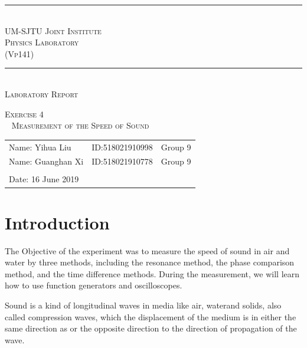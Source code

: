 \documentclass[a4paper]{report}
\begin{document}
	\renewcommand\thesection{\arabic{section}}
	\begin{Large}
		\begin{center}
			\setlength{\baselineskip}{14pt}
			\vspace{1.25cm}
			\rule[0cm]{11.2cm}{0.03em}\\
			\vspace{0.5cm}
			\textsc{UM-SJTU Joint Institute}\\
			\vspace{0.25cm}
			\textsc{Physics Laboratory\\(Vp141)}
			\vspace{0.3cm}
			\rule[0cm]{11.8cm}{0.05em}
			\vspace{4.9cm}\\
			\textsc{Laboratory Report}
		\end{center}
	\end{Large}
	\vspace{0.85cm}
	\begin{large}
		\begin{center}
			\textsc{Exercise 4}
			\\~
			\textsc{Measurement of the Speed of Sound}
		\end{center}
		\vspace{6cm}
	\end{large}
	\begin{tabular}{l l l}
	Name: Yihua Liu&ID:518021910998&Group 9\\
	Name: Guanghan Xi&ID:518021910778&Group 9\\
	&&\\
	Date: 16 June 2019&&\\
	\end{tabular}
	\thispagestyle{empty}
	\newpage
	\section{Introduction}
	The Objective of the experiment was to measure the speed of sound in air and water by three methods, including the resonance method, the phase comparison method, and the time difference methods. During the measurement, we will learn how to use function generators and oscilloscopes.
	
	Sound is a kind of longitudinal waves in media like air, waterand solids, also called compression waves, which the displacement of the medium is in either the same direction as or the opposite direction to the direction of propagation of the wave.
	
\end{document}
